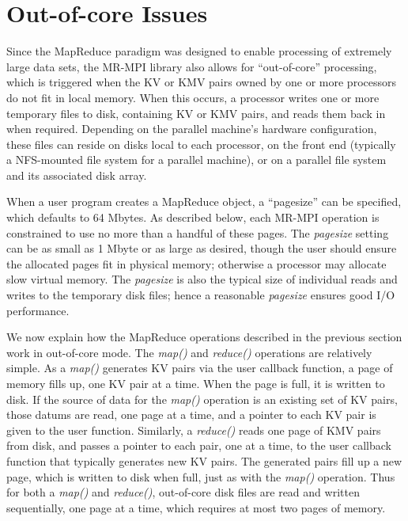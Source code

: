 \section{Out-of-core Issues}
\label{sec:outcore}

Since the MapReduce paradigm was designed to enable processing of
extremely large data sets, the MR-MPI library also allows for
``out-of-core'' processing, which is triggered when the KV or KMV
pairs owned by one or more processors do not fit in local memory.
When this occurs, a processor writes one or more temporary files to
disk, containing KV or KMV pairs, and reads them back in when
required.  Depending on the parallel machine's hardware configuration,
these files can reside on disks local to each processor, on the front
end (typically a NFS-mounted file system for a parallel machine), or
on a parallel file system and its associated disk array.

When a user program creates a MapReduce object, a ``pagesize'' can be
specified, which defaults to 64 Mbytes.  As described below, each
MR-MPI operation is constrained to use no more than a handful of these
pages.  The {\it pagesize} setting can be as small as 1 Mbyte or as
large as desired, though the user should ensure the allocated pages
fit in physical memory; otherwise a processor may allocate slow
virtual memory.  The {\it pagesize} is also the typical size of
individual reads and writes to the temporary disk files; hence a
reasonable {\it pagesize} ensures good I/O performance.

We now explain how the MapReduce operations described in the previous
section work in out-of-core mode.  The {\it map()} and {\it reduce()}
operations are relatively simple.  As a {\it map()} generates KV pairs
via the user callback function, a page of memory fills up, one KV pair
at a time.  When the page is full, it is written to disk.  If the
source of data for the {\it map()} operation is an existing set of KV
pairs, those datums are read, one page at a time, and a pointer to
each KV pair is given to the user function.  Similarly, a {\it
reduce()} reads one page of KMV pairs from disk, and passes a pointer
to each pair, one at a time, to the user callback function that
typically generates new KV pairs.  The generated pairs fill up a new
page, which is written to disk when full, just as with the {\it map()}
operation.  Thus for both a {\it map()} and {\it reduce()},
out-of-core disk files are read and written sequentially, one page at
a time, which requires at most two pages of memory.

